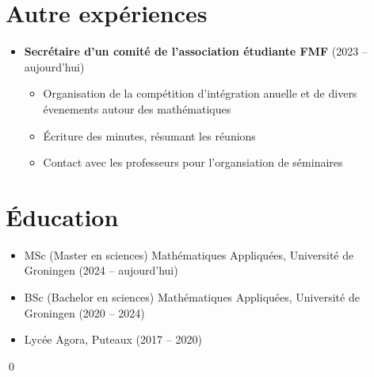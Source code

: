 \documentclass[10pt]{article}
\begin{document}
\section*{Autre expériences}
\begin{itemize}
    \item \textbf{Secrétaire d'un comité de l'association étudiante FMF} (2023 -- aujourd'hui)\begin{itemize}
    \item Organisation de la compétition d'intégration anuelle et de divers
    évenements autour des mathématiques
    \item Écriture des minutes, résumant les réunions 
    \item Contact avec les professeurs pour l'organsiation de séminaires 
\end{itemize}
\end{itemize}

\section*{Éducation}
\begin{itemize}
    \item MSc (Master en sciences) Mathématiques Appliquées, Université de Groningen (2024 -- aujourd'hui)
    \item BSc (Bachelor en sciences) Mathématiques Appliquées, Université de Groningen (2020 -- 2024)
    \item Lycée Agora, Puteaux (2017 -- 2020)
\end{itemize}


\qed
\end{document}
